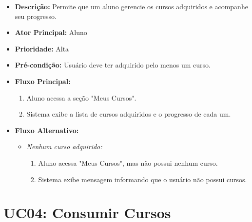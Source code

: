         \begin{itemize}
            \item \textbf{Descrição:} Permite que um aluno gerencie os cursos adquiridos e acompanhe seu progresso.
            
            \item \textbf{Ator Principal:} Aluno
            
            \item \textbf{Prioridade:} Alta
            
            \item \textbf{Pré-condição:} Usuário deve ter adquirido pelo menos um curso.
            
            \item \textbf{Fluxo Principal:}
            \begin{enumerate}
                \item Aluno acessa a seção "Meus Cursos".
                \item Sistema exibe a lista de cursos adquiridos e o progresso de cada um.
            \end{enumerate}

            \item \textbf{Fluxo Alternativo:}
            \begin{itemize}
                \item \textit{Nenhum curso adquirido:}
                \begin{enumerate}
                    \item Aluno acessa "Meus Cursos", mas não possui nenhum curso.
                    \item Sistema exibe mensagem informando que o usuário não possui cursos.
                \end{enumerate}
            \end{itemize}
        \end{itemize}

        \section*{UC04: Consumir Cursos}

